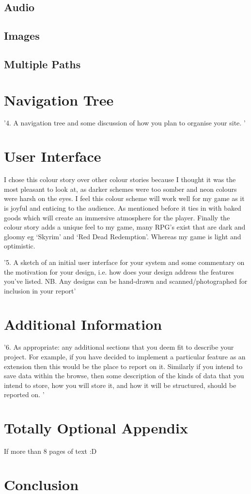 \documentclass[10pt, a4paper]{article}
\begin{document}
    \subsection{Audio}
    \subsection{Images}
    \subsection{Multiple Paths}
    
    \section{Navigation Tree}
    '4. A navigation tree and some discussion of how you plan to organise your site. '

    \section{User Interface}
    I chose this colour story over other colour stories because I thought it was the most pleasant to look at, as darker schemes were too somber and neon colours were harsh on the eyes. I feel this colour scheme will work well for my game as it is joyful and enticing to the audience. As mentioned before it ties in with baked goods which will create an immersive atmosphere for the player. Finally the colour story adds a unique feel to my game, many RPG’s exist that are dark and gloomy eg ‘Skyrim’ and ‘Red Dead Redemption’. Whereas my game is light and optimistic.
	
    '5. A sketch of an initial user interface for your system and some commentary on
    the motivation for your design, i.e. how does your design address the features
    you’ve listed. NB. Any designs can be hand-drawn and scanned/photographed for
    inclusion in your report'
    
    \section{Additional Information}
    '6. As appropriate: any additional sections that you deem fit to describe your
    project. For example, if you have decided to implement a particular feature as
    an extension then this would be the place to report on it. Similarly if you intend
    to save data within the browse, then some description of the kinds of data that
    you intend to store, how you will store it, and how it will be structured, should
    be reported on. '

    \section{Totally Optional Appendix}
    If more than 8 pages of text :D

\section{Conclusion}	


		
\end{document}
